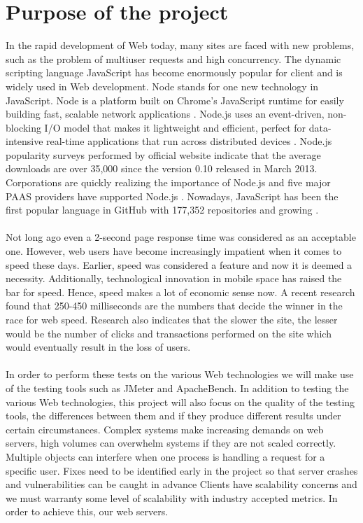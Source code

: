 \documentclass[../thesis.tex]{subfiles}
\begin{document}
\section{Purpose of the project}
In the rapid development of Web today, many sites are faced with new problems, such as the problem of multiuser requests and high concurrency. The dynamic scripting language JavaScript has become enormously popular for client and is widely used in Web development. Node stands for one new technology in JavaScript. Node is a platform built on Chrome's JavaScript runtime for easily building fast, scalable network applications \cite{server}. Node.js uses an event-driven, non- blocking I/O model that makes it lightweight and efficient, perfect for data-intensive real-time applications that run across distributed devices \cite{server}. Node.js popularity surveys performed by official website indicate that the average downloads are over 35,000 since the version 0.10 released in March 2013. Corporations are quickly realizing the importance of Node.js and five major PAAS providers have supported Node.js \cite{node}. Nowadays, JavaScript has been the first popular language in GitHub with 177,352 repositories and growing \cite{github-js}. 
\paragraph{}
Not long ago even a 2-second page response time was considered as an acceptable one. However, web users have become increasingly impatient when it comes to speed these days. Earlier, speed was considered a feature and now it is deemed a necessity. Additionally, technological innovation in mobile space has raised the bar for speed. Hence, speed makes a lot of economic sense now. A recent research found that 250-450 milliseconds are the numbers that decide the winner in the race for web speed. Research also indicates that the slower the site, the lesser would be the number of clicks and transactions performed on the site which would eventually result in the loss of users.
\paragraph{}
In order to perform these tests on the various Web technologies we will make use of the testing tools such as JMeter and ApacheBench. In addition to testing the various Web technologies, this project will also focus on the quality of the testing tools, the differences between them and if they produce different results under certain circumstances. Complex systems make increasing demands on web servers, high volumes can overwhelm systems if they are not scaled correctly. Multiple objects can interfere when one process is handling a request for a specific user. Fixes need to be identified early in the project so that server crashes and vulnerabilities can be caught in advance Clients have scalability concerns and we must warranty some level of scalability with industry accepted metrics. In order to achieve this, our web servers.
\end{document}
